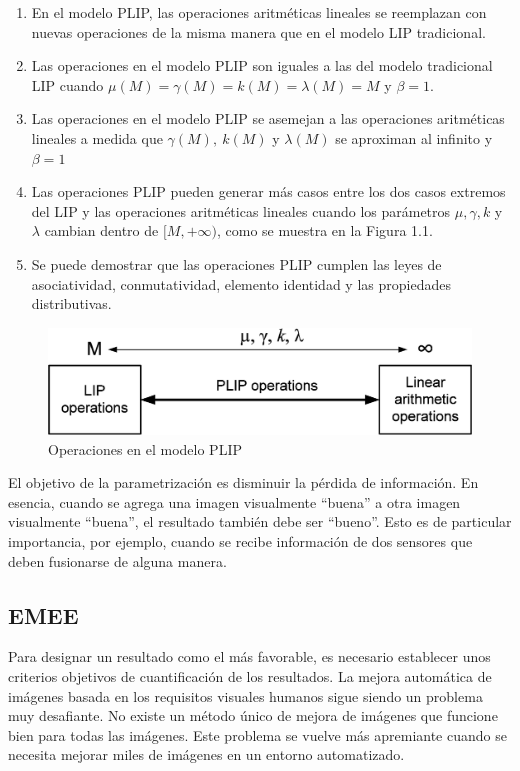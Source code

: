 \begin{enumerate}
	\item En el modelo PLIP, las operaciones aritméticas lineales se reemplazan con nuevas operaciones de la misma manera que en el modelo LIP tradicional.
	\item Las operaciones en el modelo PLIP son iguales a las del modelo tradicional LIP cuando $\mu(M) = \gamma(M) = k(M) = \lambda(M) = M$ y
	$\beta = 1$.
	\item Las operaciones en el modelo PLIP se asemejan a las operaciones aritméticas lineales a medida que $\gamma(M),~k(M)$ y $\lambda(M)$ se aproximan al infinito y $\beta = 1$
	\item Las operaciones PLIP pueden generar más casos entre los dos casos extremos del LIP y las operaciones aritméticas lineales cuando los parámetros $\mu, \gamma, k$ y $\lambda$ cambian dentro de $[M, +\infty)$, como se muestra en la Figura 1.1.
	\item Se puede demostrar que las operaciones PLIP cumplen las leyes de asociatividad, conmutatividad, elemento identidad y las propiedades distributivas.
\end{enumerate}

\begin{figure}
	\begin{center}
		\caption{Operaciones en el modelo PLIP}
		\includegraphics[width=8.0 cm]{images/plip_scheme.png}
	\end{center}
\end{figure}

El objetivo de la parametrizaci\'on es disminuir la p\'erdida de informaci\'on. En esencia, cuando se agrega una imagen visualmente ``buena'' a otra imagen visualmente ``buena'', el resultado también debe ser ``bueno''. Esto es de particular importancia, por ejemplo, cuando se recibe información de dos sensores que deben fusionarse de alguna manera.

\subsection{EMEE}

Para designar un resultado como el más favorable, es necesario establecer unos criterios objetivos de cuantificación de los resultados. La mejora automática de imágenes basada en los requisitos visuales humanos sigue siendo un problema muy desafiante. No existe un método único de mejora de imágenes que funcione bien para todas las imágenes. Este problema se vuelve más apremiante cuando se necesita mejorar miles de imágenes en un entorno automatizado.

